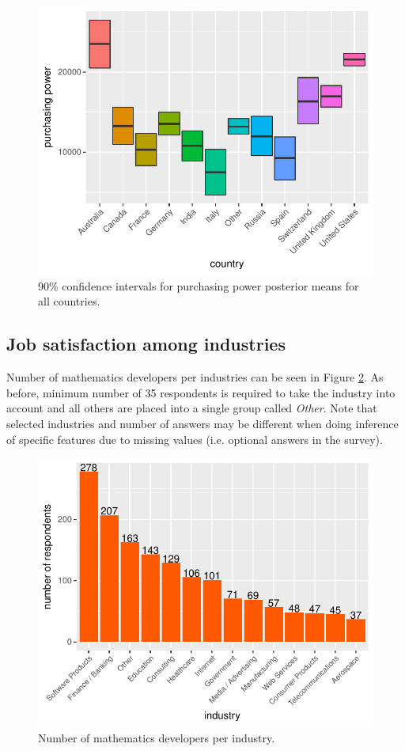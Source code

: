 \documentclass{article}
\begin{document}
\begin{figure}[H]
\centering
\includegraphics{report-029}
\caption{90\% confidence intervals for purchasing power posterior means for all countries.}\label{fig_8}
\end{figure}

\subsection{Job satisfaction among industries}
Number of mathematics developers per industries can be seen in Figure \ref{fig_9}. As before, minimum number of 35 respondents is required to take the industry into account and all others are placed into a single group called \textit{Other}. Note that selected industries and number of answers may be different when doing inference of specific features due to missing values (i.e. optional answers in the survey).


\begin{figure}[H]
\centering
\includegraphics{report-031}
\caption{Number of mathematics developers per industry.}\label{fig_9}
\end{figure}
\end{document}
